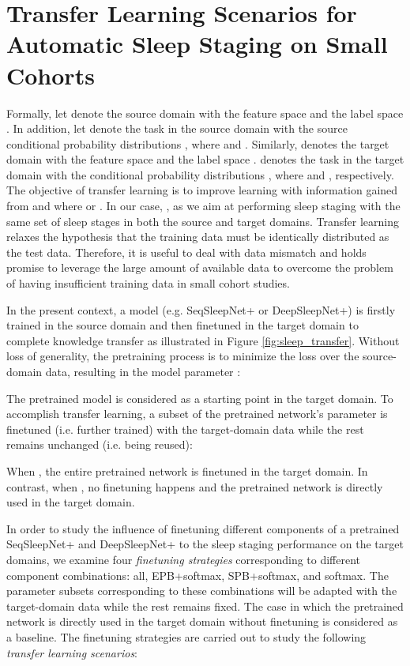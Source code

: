 \documentclass[journal,twoside,web]{ieeecolor}
\begin{document}
\vspace{-0.15cm}
\section{Transfer Learning Scenarios for Automatic Sleep Staging on Small Cohorts}

Formally, let  denote the source domain with the feature space  and the label space . In addition, let  denote the task in the source domain with the source conditional probability distributions , where  and . Similarly,  denotes the target domain with the feature space  and the label space .  denotes the task in the target domain with the conditional probability distributions , where  and , respectively. The objective of transfer learning is to improve learning  with information gained from   and  where  or   \cite{Pan2010}. In our case, , as we aim at performing sleep staging with the same set of sleep stages in both the source and target domains. Transfer learning \cite{Pan2010} relaxes the hypothesis that the training data must be  identically distributed as the test data. Therefore, it is useful to deal with data mismatch and holds promise to leverage the large amount of available data to overcome the problem of having insufficient training data in small cohort studies.

In the present context, a model (e.g. SeqSleepNet+ or DeepSleepNet+) is firstly trained in the source domain  and then finetuned in the target domain to complete knowledge transfer as illustrated in Figure \ref{fig:sleep_transfer}. Without loss of generality, the pretraining process is to minimize the loss  over the source-domain data, resulting in the model parameter :

The pretrained model is considered as a starting point in the target domain. To accomplish transfer learning, a subset of the pretrained network's parameter  is finetuned (i.e. further trained) with the target-domain data while the rest  remains unchanged (i.e. being reused):

When , the entire pretrained network is finetuned in the target domain. In contrast, when , no finetuning happens and the pretrained network is directly used in the target domain.

In order to study the influence of finetuning different components of a pretrained SeqSleepNet+ and DeepSleepNet+ to the sleep staging performance on the target domains, we examine four \emph{finetuning strategies} corresponding to different component combinations: all, EPB+softmax, SPB+softmax, and softmax. The parameter subsets corresponding to these combinations will be adapted with the target-domain data while the rest remains fixed. The case in which the pretrained network is directly used in the target domain without finetuning is considered as a baseline. The finetuning strategies are carried out to study the following \emph{transfer learning scenarios}:
\end{document}
